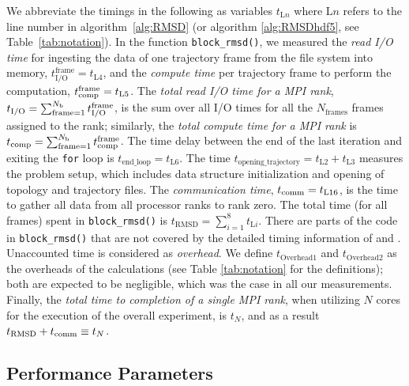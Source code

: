 We abbreviate the timings in the following as variables $t_{\text{L$n$}}$ where $\text{L$n$}$ refers to the line number in algorithm~\ref{alg:RMSD} (or algorithm \ref{alg:RMSDhdf5}, see Table~\ref{tab:notation}).
In the function \texttt{block\_rmsd()}, we measured the \emph{read I/O time} for ingesting the data of one trajectory frame from the file system into memory, $t_{\text{I/O}}^{\text{frame}} = t_{\text{L4}}$, and the \emph{compute time} per trajectory frame to perform the computation, ${t}_{\text{comp}}^{\text{frame}} = t_{\text{L5}}$.
The \emph{total read I/O time for a MPI rank},  ${t}_{\text{I/O}} = \sum_{\text{frame}=1}^{N_{\text{b}}} {t}_{\text{I/O}}^{\text{frame}}$, is the sum over all I/O times for all the $N_{\text{frames}}$ frames assigned to the rank; similarly, the \emph{total compute time for a MPI rank} is ${t}_{\text{comp}} = \sum_{\text{frame}=1}^{N_{\text{b}}} {t}_{\text{comp}}^{\text{frame}}$. 
The time delay between the end of the last iteration and exiting the \texttt{for} loop is $t_{\text{end\_loop}} = t_{\text{L6}}$.
The time $t_{\text{opening\_trajectory}} = t_{\text{L2}}+t_{\text{L3}}$ measures the problem setup, which includes data structure initialization and opening of topology and trajectory files.
The \emph{communication time}, $t_{\text{comm}} = t_{\text{L16}}$, is the time to gather all data from all processor ranks to rank zero.
The total time (for all frames) spent in \texttt{block\_rmsd()} is $t_{\text{RMSD}} = \sum_{i=1}^{8}t_{\text{L$i$}}$. 
There are parts of the code in \texttt{block\_rmsd()} that are not covered by the detailed timing information of \tcomp and \tIO.
Unaccounted time is considered as \emph{overhead}.
We define $t_{\text{Overhead1}}$ and $t_{\text{Overhead2}}$ as the overheads of the calculations (see Table \ref{tab:notation} for the definitions); both are expected to be negligible, which was the case in all our measurements. 
Finally, the \emph{total time to completion of a single MPI rank}, when utilizing $N$ cores for the execution of the overall experiment, is $t_{N}$, and as a result $t_{\text{RMSD}} + t_{\text{comm}} \equiv t_{N}$.

\subsection{Performance Parameters}

